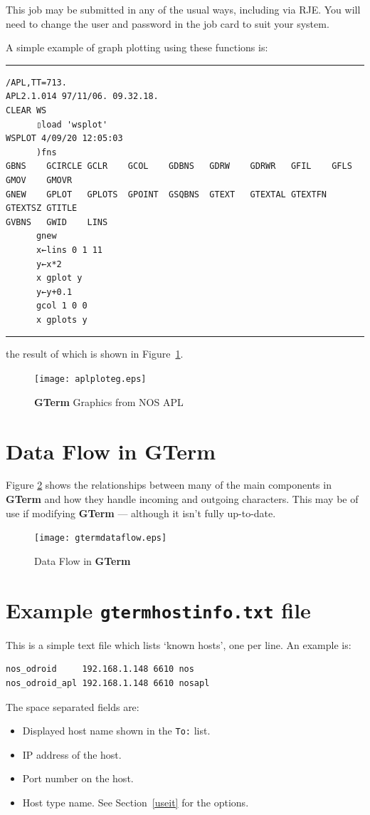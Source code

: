 \documentclass[a4paper,twoside,11pt]{article}
\newcommand{\newpara}{\par\vspace{4mm}\noindent}
\begin{document}
\newpara
This job may be submitted in any of the usual ways, including via RJE. You will need to change the user
and password in the job card to suit your system.

\newpara
A simple example of graph plotting using these functions is:
\newpara
\hrule
{\scriptsize
\begin{verbatim}
/APL,TT=713.
APL2.1.014 97/11/06. 09.32.18.
CLEAR WS
      ▯load 'wsplot'
WSPLOT 4/09/20 12:05:03
      )fns
GBNS    GCIRCLE GCLR    GCOL    GDBNS   GDRW    GDRWR   GFIL    GFLS    GMOV    GMOVR
GNEW    GPLOT   GPLOTS  GPOINT  GSQBNS  GTEXT   GTEXTAL GTEXTFN GTEXTSZ GTITLE  
GVBNS   GWID    LINS
      gnew
      x←lins 0 1 11
      y←x*2
      x gplot y
      y←y+0.1
      gcol 1 0 0
      x gplots y
\end{verbatim}
}
\hrule
\newpara
the result of which is shown in Figure~\ref{fig:graf2}.

\begin{figure}
	\centering
		\texttt{[image: aplploteg.eps]}
	\caption{\textbf{GTerm} Graphics from NOS APL}
	\label{fig:graf2}
\end{figure}


\section{Data Flow in \textbf{GTerm}}
Figure \ref{fig:dataflow} shows the relationships between many of the
main components in \textbf{GTerm} and how they handle incoming and outgoing characters.
This may be of use if modifying \textbf{GTerm} --- although it isn't fully up-to-date.

\begin{figure}
	\centering
		\texttt{[image: gtermdataflow.eps]}
	\caption{Data Flow in \textbf{GTerm}}
	\label{fig:dataflow}
\end{figure}

\section{Example \texttt{gtermhostinfo.txt} file}
This is a simple text file which lists `known hosts', one per line. An example is:
\begin{lstlisting}
nos_odroid     192.168.1.148 6610 nos
nos_odroid_apl 192.168.1.148 6610 nosapl
\end{lstlisting}
The space separated fields are: 
\begin{itemize}
\item  Displayed host name shown in the \texttt{To:} list.
\item IP address of the host.
\item Port number on the host.
\item Host type name. See Section~\ref{useit} for the options.
\end{itemize}
\end{document}
